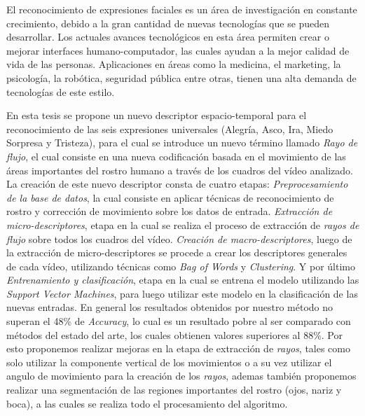 \documentclass[final]{udpthesis}
\begin{document}
\begin{resumen}
El reconocimiento de expresiones faciales es un área de investigación en constante crecimiento, debido a la gran cantidad de nuevas tecnologías que se pueden desarrollar. Los actuales avances tecnológicos en esta área permiten crear o mejorar interfaces humano-computador, las cuales ayudan a la mejor calidad de vida de las personas. Aplicaciones en áreas como la medicina, el marketing, la psicología, la robótica, seguridad pública entre otras, tienen una alta demanda de tecnologías de este estilo.

En esta tesis se propone un nuevo descriptor espacio-temporal para el reconocimiento de las seis expresiones universales (Alegría, Asco, Ira, Miedo Sorpresa y Tristeza), para el cual se introduce un nuevo término llamado \textit{Rayo de flujo}, el cual consiste en una nueva codificación  basada en el movimiento de las áreas importantes del rostro humano a través de los cuadros del vídeo analizado. La creación de este nuevo descriptor consta de cuatro etapas:  \emph{Preprocesamiento de la base de datos}, la cual consiste en aplicar técnicas de reconocimiento de rostro y corrección de movimiento sobre los datos de entrada. \emph{Extracción de micro-descriptores}, etapa en la cual se realiza el proceso de extracción de \textit{rayos de flujo} sobre todos los cuadros del vídeo. \emph{Creación de macro-descriptores}, luego de la extracción de micro-descriptores se procede a crear los descriptores generales de cada vídeo, utilizando técnicas como \textit{Bag of Words} y \textit{Clustering}. Y por último \emph{Entrenamiento y clasificación}, etapa en la cual se entrena el modelo utilizando  las \emph{Support Vector Machines}, para luego utilizar este modelo en la clasificación de las nuevas entradas. En general los resultados obtenidos por nuestro método no superan el 48\% de \textit{Accuracy}, lo cual es un resultado pobre al ser comparado con métodos del estado del arte, los cuales obtienen valores superiores al 88\%. Por esto proponemos realizar mejoras en la etapa de extracción de \textit{rayos}, tales como solo utilizar la componente vertical de los movimientos o a su vez utilizar el angulo de movimiento para la creación de los \textit{rayos}, ademas también proponemos realizar una segmentación de las regiones importantes del rostro (ojos, nariz y boca), a las cuales se realiza todo el procesamiento del algoritmo.
\end{resumen}



\mainmatter
\end{document}
